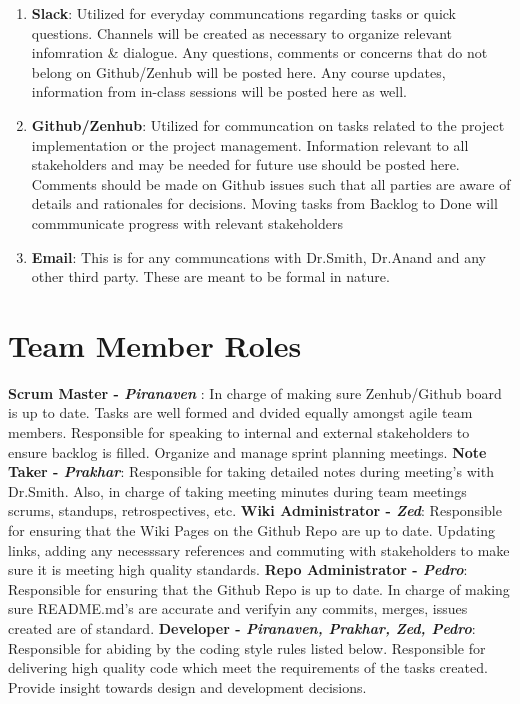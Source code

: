 \documentclass{article}
\begin{document}
\begin{enumerate}
\item \textbf{Slack}: Utilized for everyday communcations regarding tasks or quick questions. Channels will be created as necessary to organize relevant infomration \& dialogue. Any questions, comments or concerns that do not belong on Github/Zenhub will be posted here. Any course updates, information from in-class sessions will be posted here as well. 
\item \textbf{Github/Zenhub}: Utilized for communcation on tasks related to the project implementation or the project management. Information relevant to all stakeholders and may be needed for future use should be posted here.  Comments should be made on Github issues such that all parties are aware of details and rationales for decisions. Moving tasks from Backlog to Done will commmunicate progress with relevant stakeholders  
\item \textbf{Email}: This is for any communcations with Dr.Smith, Dr.Anand and any other third party. These are meant to be formal in nature.
\end{enumerate}

\section{Team Member Roles}

\textbf{Scrum Master -\emph{ Piranaven }}: In charge of making sure Zenhub/Github board is up to date. Tasks are well formed and dvided equally amongst agile team members. Responsible for  speaking to internal and external stakeholders to ensure backlog is filled. Organize and manage sprint planning meetings. \newline
\textbf{Note Taker - \emph{Prakhar}}: Responsible for taking detailed notes during meeting's with Dr.Smith. Also, in charge of taking  meeting minutes during team meetings  scrums, standups, retrospectives, etc. \newline
\textbf{Wiki Administrator - \emph{Zed}}:  Responsible for ensuring that the Wiki Pages on the Github Repo are up to date. Updating links, adding any necesssary references and commuting with stakeholders to make sure it is meeting high quality standards.  \newline 
\textbf{Repo Administrator - \emph{ Pedro}}:  Responsible for ensuring that the Github Repo is up to date. In charge of making sure README.md's are accurate and verifyin any commits, merges, issues created are of standard.   \newline
\textbf{Developer - \emph{ Piranaven, Prakhar, Zed, Pedro}}: Responsible for abiding by the coding style rules listed below. Responsible for delivering high quality code which meet the requirements of the tasks created. Provide insight towards design and development decisions.  \newline
\end{document}
